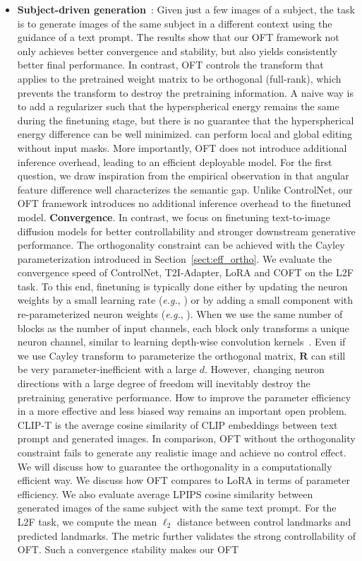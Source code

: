 \begin{itemize}[leftmargin=*,nosep]
\begin{itemize}[leftmargin=*,nosep]
    \item \textbf{Subject-driven generation}~\cite{ruiz2023dreambooth}: Given just a few images of a subject, the task is to generate images of the same subject in a different context using the guidance of a text prompt. The results show that our OFT framework not only achieves better convergence and stability, but also yields consistently better final performance.  In contrast, OFT controls the transform that applies to the pretrained weight matrix to be orthogonal (full-rank), which prevents the transform to destroy the pretraining information. A naive way is to add a regularizer such that the hyperspherical energy remains the same during the finetuning stage, but there is no guarantee that the hyperspherical energy difference can be well minimized. \cite{hertz2022prompt} can perform local and global editing without input masks. More importantly, OFT does not introduce additional inference overhead, leading to an efficient deployable model. For the first question, we draw inspiration from the empirical observation in \cite{liu2018decoupled,chen2020angular} that angular feature difference well characterizes the semantic gap. Unlike ControlNet, our OFT framework introduces no additional inference overhead to the finetuned model. \textbf{Convergence}. In contrast, we focus on finetuning text-to-image diffusion models for better controllability and stronger downstream generative performance. The orthogonality constraint can be achieved with the Cayley parameterization introduced in Section~\ref{sect:eff_ortho}. We evaluate the convergence speed of ControlNet, T2I-Adapter, LoRA and COFT on the L2F task. To this end, finetuning is typically done either by updating the neuron weights by a small learning rate (\emph{e.g.}, \cite{ruiz2023dreambooth}) or by adding a small component with re-parameterized neuron weights (\emph{e.g.}, \cite{hulora2022,zhang2023adding}). When we use the same number of blocks as the number of input channels, each block only transforms a unique neuron channel, similar to learning depth-wise convolution kernels~\cite{chollet2017xception}. Even if we use Cayley transform to parameterize the orthogonal matrix, $\bm{R}$ can still be very parameter-inefficient with a large $d$. However, changing neuron directions with a large degree of freedom will inevitably destroy the pretraining generative performance. How to improve the parameter efficiency in a more effective and less biased way remains an important open problem. CLIP-T is the average cosine similarity of CLIP embeddings between text prompt and generated images. In comparison, OFT without the orthogonality constraint fails to generate any realistic image and achieve no control effect. We will discuss how to guarantee the orthogonality in a computationally efficient way. We discuss how OFT compares to LoRA in terms of parameter efficiency. We also evaluate average LPIPS cosine similarity between generated images of the same subject with the same text prompt. For the L2F task, we compute the mean $\ell_2$ distance between control landmarks and predicted landmarks. The metric further validates the strong controllability of OFT. Such a convergence stability makes our OFT 
\end{itemize}
\end{itemize}
